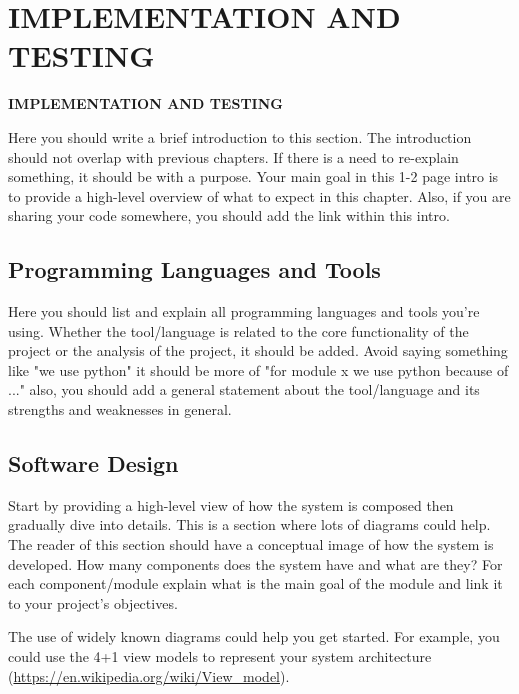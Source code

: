 \chapter{IMPLEMENTATION AND TESTING}
\pagebreak


\begin{center}
{\LARGE\textbf{IMPLEMENTATION AND TESTING}}
\end{center}

Here you should write a brief introduction to this section. The introduction should not overlap with previous chapters. If there is a need to re-explain something, it should be with a purpose. Your main goal in this 1-2 page intro is to provide a high-level overview of what to expect in this chapter. Also, if you are sharing your code somewhere, you should add the link within this intro.
    
\section{Programming Languages and Tools} %
\label{sec:programming-languages-and-tools}

Here you should list and explain all programming languages and tools you're using. Whether the tool/language is related to the core functionality of the project or the analysis of the project, it should be added. Avoid saying something like "we use python" it should be more of "for module x we use python because of ..." also, you should add a general statement about the tool/language and its strengths and weaknesses in general.


\section{Software Design}%
\label{sec:software-design}

Start by providing a high-level view of how the system is composed then gradually dive into details. This is a section where lots of diagrams could help. The reader of this section should have a conceptual image of how the system is developed. How many components does the system have and what are they? For each component/module explain what is the main goal of the module and link it to your project's objectives.

The use of widely known diagrams could help you get started. For example, you could use the 4+1 view models to represent your system architecture (\url{https://en.wikipedia.org/wiki/View_model}).


